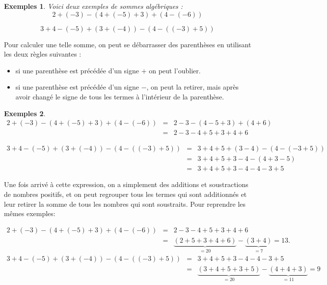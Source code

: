 \documentclass[12 pt]{article}
\theoremstyle{plain}
\newcounter{n}
\numberwithin{n}{section}
\newtheorem*{exs}{Exemples}
\begin{document}
\begin{exs}Voici deux exemples de sommes algébriques : 
\[ 2 + (-3 ) - (4 + (-5) + 3) + (4 - (-6) ) \]

\[ 3 + 4 - (-5) + (3 + (-4) ) - (4 - ((-3) + 5))\]
\end{exs}

Pour calculer une telle somme, on peut se débarrasser des parenthèses en utilisant les deux règles suivantes : 
\begin{itemize}
\item si une parenthèse est précédée d'un signe $+$ on peut l'oublier.
\item si une parenthèse est précédée d'un signe $-$, on peut la retirer, mais après avoir changé le signe de tous 
les termes à l'intérieur de la parenthèse. 
\end{itemize}
\begin{exs}
\begin{eqnarray*}
 2 + (-3 ) - (4 + (-5) + 3) + (4 - (-6) )  &=& 2 - 3 - (4 - 5 + 3) + (4 + 6) \\
 &=& 2 - 3 - 4 + 5 + 3 + 4 + 6
\end{eqnarray*}

\begin{eqnarray*}
  3 + 4 - (-5) + (3 + (-4) ) - (4 - ((-3) + 5))  &=& 3 + 4 + 5 + (3 - 4) - ( 4 - (-3+5) ) \\
 &=& 3 + 4 + 5 + 3 - 4 - ( 4 + 3  - 5)   \\
  &=& 3 + 4 + 5 + 3 - 4 -  4 - 3 + 5 
\end{eqnarray*}
\end{exs}


Une fois arrivé à cette expression, on a simplement des additions et soustractions de nombres positifs, 
et on peut regrouper tous les termes qui sont additionnés et leur retirer la somme de tous les nombres qui sont 
soustraits. Pour reprendre les mêmes exemples:

\begin{eqnarray*}
 2 + (-3 ) - (4 + (-5) + 3) + (4 - (-6) ) 
 &=& 2 - 3 - 4 + 5 + 3 + 4 + 6\\
 &=& \underbrace{(2+ 5 + 3 + 4  +6)}_{=20} - \underbrace{(3+4)}_{=7} = 13.
\end{eqnarray*}
\begin{eqnarray*}
  3 + 4 - (-5) + (3 + (-4) ) - (4 - ((-3) + 5)) &= & 3 + 4 + 5 + 3 - 4 -  4 - 3 + 5 \\ 
  &=&\underbrace{(3+4+5+3+5)}_{=20}-\underbrace{(4+4+3)}_{=11}= 9
\end{eqnarray*}
\end{document}
